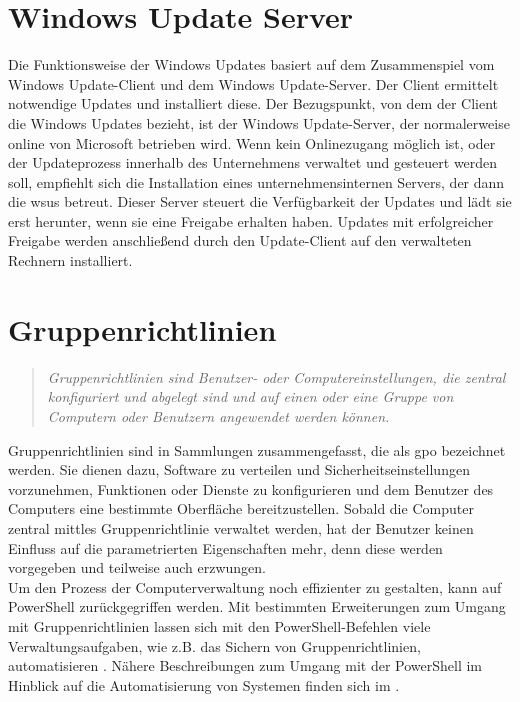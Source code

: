 \section{Windows Update Server}\label{sec:wsus}
Die Funktionsweise der Windows Updates basiert auf dem Zusammenspiel vom Windows Update-Client und dem Windows Update-Server. Der Client ermittelt notwendige Updates und installiert diese. Der Bezugspunkt, von dem der Client die Windows Updates bezieht, ist der Windows Update-Server, der normalerweise online von Microsoft betrieben wird. Wenn kein Onlinezugang möglich ist, oder der Updateprozess innerhalb des Unternehmens verwaltet und gesteuert werden soll, empfiehlt sich die Installation eines unternehmensinternen Servers, der dann die \acrfull{wsus} betreut. Dieser Server steuert die Verfügbarkeit der Updates und lädt sie erst herunter, wenn sie eine Freigabe erhalten haben. Updates mit erfolgreicher Freigabe werden anschließend durch den Update-Client auf den verwalteten Rechnern installiert. \cite[S.~235 f.]{Voges2019}
\newpage
\section{Gruppenrichtlinien}\label{sec:GPO}
\begin{quote} \textit{\glqq Gruppenrichtlinien sind Benutzer- oder Computereinstellungen, die zentral konfiguriert und abgelegt sind und auf einen oder eine Gruppe von Computern oder Benutzern angewendet werden k{\"o}nnen.\grqq{}}~\cite[S.~1]{Voges2019}\end{quote}
Gruppenrichtlinien sind in Sammlungen zusammengefasst, die als \acrfull{gpo} bezeichnet werden.
Sie dienen dazu, Software zu verteilen und Sicherheitseinstellungen vorzunehmen, Funktionen oder Dienste zu konfigurieren und dem Benutzer des Computers eine bestimmte Oberfläche bereitzustellen. Sobald die Computer zentral mittles Gruppenrichtlinie verwaltet werden, hat der Benutzer keinen Einfluss auf die parametrierten Eigenschaften mehr, denn diese werden vorgegeben und teilweise auch erzwungen. \cite[S.~1]{Voges2019}\medskip\\
Um den Prozess der Computerverwaltung noch effizienter zu gestalten, kann auf PowerShell zurückgegriffen werden. Mit bestimmten Erweiterungen zum Umgang mit Gruppenrichtlinien lassen sich mit den PowerShell-Befehlen viele Verwaltungsaufgaben, wie z.B. das Sichern von Gruppenrichtlinien, automatisieren \cite[S.~517]{Voges2019}. Nähere Beschreibungen zum Umgang mit der PowerShell im Hinblick auf die Automatisierung von Systemen finden sich im .
